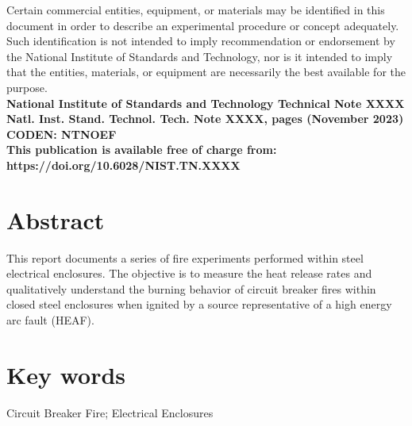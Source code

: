\documentclass[12pt]{article}
\newcommand{\pubnumber}{XXXX}
\newcommand{\DOI}{https://doi.org/10.6028/NIST.TN.XXXX}
\newcommand{\monthyear}{November 2023}
\begin{document}
\begin{titlepage}
\begin{flushright}
\footnotesize  Certain commercial entities, equipment, or materials may be identified in this document in order to describe an experimental procedure or concept adequately. Such identification is not intended to imply recommendation or endorsement by the National Institute of Standards and Technology, nor is it intended to imply that the entities, materials, or equipment are necessarily the best available for the purpose.\\
\vfill
\normalsize \textbf{National Institute of Standards and Technology Technical Note \pubnumber\\
Natl. Inst. Stand. Technol. Tech. Note \pubnumber, \pageref{LastPage} pages (\monthyear)} \\
\textbf{CODEN: NTNOEF}\\
\vspace{12pt}
\textbf{This publication is available free of charge from: \DOI}
\vfill
\end{flushright}
\end{titlepage}


\section*{Abstract}

\normalsize This report documents a series of fire experiments performed within steel electrical enclosures. The objective is to measure the heat release rates and qualitatively understand the burning behavior of circuit breaker fires within closed steel enclosures when ignited by a source representative of a high energy arc fault (HEAF).  \\

\section*{Key words}
\normalsize Circuit Breaker Fire; Electrical Enclosures\\
\pagebreak
\begin{center}
	\tableofcontents
	\listoftables
	\listoffigures
\end{center}
\end{document}

